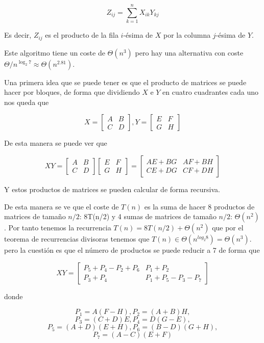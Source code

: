 $$Z_{ij} = \displaystyle\sum_{k = 1}^{n}X_{ik} Y_{kj}$$

Es decir, $Z_{ij}$ es el producto de la fila $i$-ésima de $X$ por la columna
$j$-ésima de $Y$.

Este algoritmo tiene un coste de $\Theta(n^3)$ pero hay una alternativa con
coste $\Theta/n^{\log_2 7} \approx \Theta(n^{2.81})$.

Una primera idea que se puede tener es que el producto de matrices se puede
hacer por bloques, de forma que dividiendo $X$ e $Y$ en cuatro cuadrantes cada
uno nos queda que

$$
X = 
\begin{bmatrix}
    A & B \\
    C & D
\end{bmatrix},
Y = 
\begin{bmatrix}
    E & F \\
    G & H
\end{bmatrix}
$$

De esta manera se puede ver que 

$$
XY =
\begin{bmatrix}
    A & B \\
    C & D
\end{bmatrix}
\begin{bmatrix}
    E & F \\
    G & H
\end{bmatrix}
=
\begin{bmatrix}
    AE + BG & AF + BH \\
    CE + DG & CF + DH
\end{bmatrix}
$$

Y estos productos de matrices se pueden calcular de forma recursiva.

De esta manera se ve que el coste de $T(n)$ es la suma de hacer 8 productos de
matrices de tamaño $n/2$: 8T(n/2) y 4 sumas de matrices de tamaño $n/2$:
$\Theta(n^2)$. Por tanto tenemos la recurrencia $T(n) = 8T(n/2) + \Theta(n^2)$
que por el teorema de recurrencias divisoras tenemos que $T(n) \in
\Theta(n^{log_2 8}) = \Theta(n^3)$. pero la cuestión es que el número de
productos se puede reducir a 7 de forma que

$$
XY = 
\begin{bmatrix}
    P_5 + P_4 - P_2 + P_6 & P_1 + P_2 \\
    P_3 + P_4 & P_1 + P_5 - P_3 - P_7
\end{bmatrix}
$$

donde

$$P_1 = A(F - H), P_2 = (A + B)H,$$
$$P_3 = (C + D)E, P_4 = D(G - E),$$
$$P_5 = (A + D)(E + H), P_6 = (B - D)(G + H),$$
$$P_7 = (A - C)(E + F)$$

